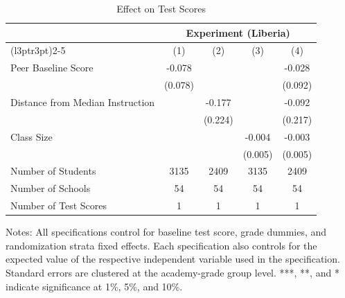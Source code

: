 \begin{table}[!h]
\centering\centering\centering
\caption{Effect on Test Scores}
\centering
\begin{threeparttable}
\fontsize{10}{12}\selectfont
\begin{tabular}[t]{lcccc}
\toprule
\multicolumn{1}{c}{ } & \multicolumn{4}{c}{Experiment (Liberia)} \\
\cmidrule(l{3pt}r{3pt}){2-5}
  & (1) & (2) & (3) & (4)\\
\midrule
Peer Baseline Score & -0.078 &  &  & -0.028\\
 & (0.078) &  &  & (0.092)\\
Distance from Median Instruction &  & -0.177 &  & -0.092\\
 &  & (0.224) &  & (0.217)\\
Class Size &  &  & -0.004 & -0.003\\
 &  &  & (0.005) & (0.005)\\
\hline
\midrule
Number of Students & 3135 & 2409 & 3135 & 2409\\
Number of Schools & 54 & 54 & 54 & 54\\
Number of Test Scores & 1 & 1 & 1 & 1\\
\bottomrule
\end{tabular}
\begin{tablenotes}[para]
\item Notes: All specifications control for baseline test score, grade dummies, and randomization strata fixed effects. Each specification also controls for the expected value of the respective independent variable used in the specification. Standard errors are clustered at the academy-grade group level. ***, **, and * indicate significance at 1\%, 5\%, and 10\%.
\end{tablenotes}
\end{threeparttable}
\end{table}

